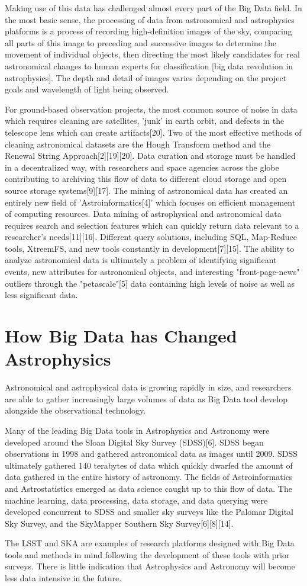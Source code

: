 \documentclass[letterpaper]{report}
\begin{document}
Making use of this data has challenged almost every part of the Big Data field. In the most basic sense, the processing of data from astronomical and astrophysics platforms is a process of recording high-definition images of the sky, comparing all parts of this image to preceding and successive images to determine the movement of individual objects, then directing the most likely candidates for real astronomical changes to human experts for classification [big data revolution in astrophysics]. The depth and detail of images varies depending on the project goals and wavelength of light being observed. 

For ground-based observation projects, the most common source of noise in data which requires cleaning are satellites, 'junk' in earth orbit, and defects in the telescope lens which can create artifacts[20]. Two of the most effective methods of cleaning astronomical datasets are the Hough Transform method and the Renewal String Approach[2][19][20]. Data curation and storage must be handled in a decentralized way, with researchers and space agencies across the globe contributing to archiving this flow of data to different cloud storage and open source storage systems[9][17]. The mining of astronomical data has created an entirely new field of 'Astroinformatics[4]' which focuses on efficient management of computing resources. Data mining of astrophysical and astronomical data requires search and selection features which can quickly return data relevant to a researcher's needs[11][16]. Different query solutions, including SQL, Map-Reduce tools, XtreemFS, and new tools constantly in development[7][15]. The ability to analyze astronomical data is ultimately a problem of identifying significant events, new attributes for astronomical objects, and interesting "front-page-news" outliers through the "petascale"[5] data containing high levels of noise as well as less significant data.
 
\section{How Big Data has Changed Astrophysics}
Astronomical and astrophysical data is growing rapidly in size, and researchers are able to gather increasingly large volumes of data as Big Data tool develop alongside the observational technology. 


Many of the leading Big Data tools in Astrophysics and Astronomy were developed around the Sloan Digital Sky Survey (SDSS)[6]. SDSS began observations in 1998 and gathered astronomical data as images until 2009. SDSS ultimately gathered 140 terabytes of data which quickly dwarfed the amount of data gathered in the entire history of astronomy. The fields of Astroinformatics and Astrostatistics emerged as data science caught up to this flow of data. The machine learning, data processing, data storage, and data querying were developed concurrent to SDSS and smaller sky surveys like the Palomar Digital Sky Survey, and the SkyMapper Southern Sky Survey[6][8][14]. 

The LSST and SKA are examples of research platforms designed with Big Data tools and methods in mind following the development of these tools with prior surveys. There is little indication that Astrophysics and Astronomy will become less data intensive in the future.  
\end{document}

